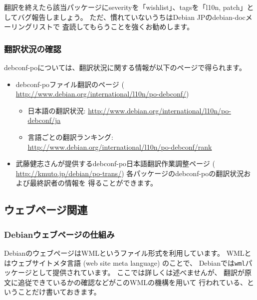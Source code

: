 \documentclass[mingoth,a4paper]{jsarticle}
\begin{document}
翻訳を終えたら該当パッケージにseverityを「wishlist」、tagsを「l10n,
patch」としてバグ報告しましょう。
ただ、慣れていないうちはDebian JPのdebian-docメーリングリストで
査読してもらうことを強くお勧めします。


\subsubsection{翻訳状況の確認}
\label{subsubsec:debconf-po-check}

debconf-poについては、翻訳状況に関する情報が以下のページで得られます。
\begin{itemize}
 \item debconf-poファイル翻訳のページ (%
       \url{http://www.debian.org/international/l10n/po-debconf/})
       \begin{itemize}
	\item 日本語の翻訳状況:
	      \url{http://www.debian.org/international/l10n/po-debconf/ja}
	\item 言語ごとの翻訳ランキング:
	      \url{http://www.debian.org/international/l10n/po-debconf/rank}
       \end{itemize}
 \item 武藤健志さんが提供するdebconf-po日本語翻訳作業調整ページ (%
	    \url{http://kmuto.jp/debian/po-trans/})
       各パッケージのdebconf-poの翻訳状況および最終訳者の情報を
       得ることができます。
\end{itemize}

\subsection{ウェブページ関連}

\subsubsection{Debianウェブページの仕組み}

DebianのウェブページはWMLというファイル形式を利用しています。
WMLとはウェブサイトメタ言語 (web site meta language) のことで、
Debianでは\texttt{wml}パッケージとして提供されています。
ここでは詳しくは述べませんが、
翻訳が原文に追従できているかの確認などがこのWMLの機構を用いて
行われている、ということだけ書いておきます。
\end{document}
